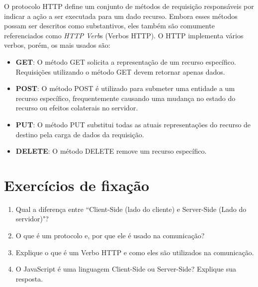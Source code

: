 O protocolo HTTP define um conjunto de métodos de requisição responsáveis por indicar a ação a ser executada para um dado recurso. Embora esses métodos possam ser descritos como substantivos, eles também são comumente referenciados como \textit{HTTP Verb}s (Verbos HTTP). O HTTP implementa vários verbos, porém, os mais usados são:

\begin{itemize}[leftmargin=1.7cm]
	\setlength\itemsep{0em}
	\item \textbf{GET}: O método GET solicita a representação de um recurso específico. Requisições utilizando o método GET devem retornar apenas dados.
	\item \textbf{POST}: O método POST é utilizado para submeter uma entidade a um recurso específico, frequentemente causando uma mudança no estado do recurso ou efeitos colaterais no servidor.
	\item \textbf{PUT}: O método PUT substitui todas as atuais representações do recurso de destino pela carga de dados da requisição.
	\item \textbf{DELETE}: O método DELETE remove um recurso específico.
\end{itemize}

\section{Exercícios de fixação}

\begin{enumerate}[leftmargin=1.7cm]
	\setlength\itemsep{0em}
	\item Qual a diferença entre ``Client-Side (lado do cliente) e Server-Side (Lado do servidor)"?
	\item O que é um protocolo e, por que ele é usado na comunicação?
	\item Explique o que é um Verbo HTTP e como eles são utilizados na comunicação.
	\item O JavaScript é uma linguagem Client-Side ou Server-Side? Explique sua resposta.
\end{enumerate}